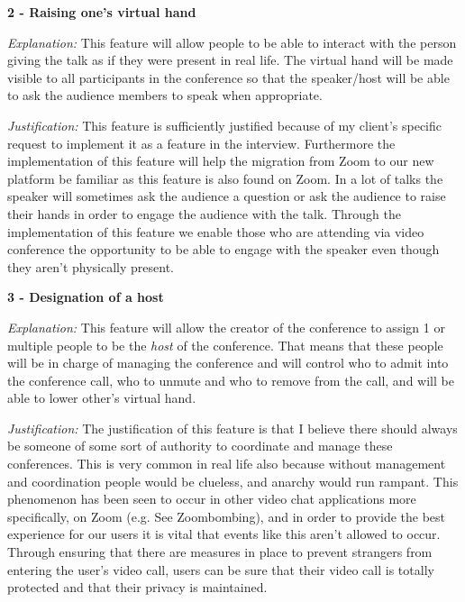\vspace{0.2cm}

\textsf{\bfseries 2 - Raising one's virtual hand} \\ \vspace{0.1cm}

\textit{Explanation:} This feature will allow people to be
able to interact with the
person giving the talk as if they were present in real life.
The virtual hand will be made visible to all participants in 
the conference so that the speaker/host will be able to ask 
the audience members to speak when appropriate.\\
\vspace{0.1cm}

\textit{Justification:} This feature
is sufficiently justified because of my client's specific 
request to implement it as a feature in the interview. 
Furthermore the implementation of this feature will help the 
migration from Zoom to our new platform be familiar as this 
feature is also found on Zoom. In a lot of talks the speaker
will sometimes ask the audience a question or ask the audience
to raise their hands in order to engage the audience with the
talk. Through the implementation of this feature we enable 
those who are attending via video conference the opportunity
to be able to engage with the speaker even though they aren't
physically present.

\vspace{0.2cm}

\textsf{\bfseries 3 - Designation of a host} \\ \vspace{0.1cm}

\textit{Explanation:} This feature will allow the creator of
the conference to assign 1 or multiple people to be the 
\textit{host} of the conference. That means that these
people will be in charge of 
managing the conference and will control who to admit into the
conference call, who to unmute and who to remove from the
call, and will be able to lower other's virtual hand. 
\vspace{0.1cm}

\textit{Justification:} The
justification of this feature is that I believe there should 
always be someone of some sort of authority to coordinate and 
manage these conferences. This is very common in real life
also because without management and coordination people
would be clueless, and anarchy would run rampant. This
phenomenon has been seen to occur in other video chat 
applications more specifically, on Zoom 
(e.g. See Zoombombing), and in order to provide the 
best experience for our users it is vital that events like 
this aren't allowed to occur. Through ensuring that there are
measures in place to prevent strangers from entering the
user's video call, users can be sure that their video call is
totally protected and that their privacy is maintained.

